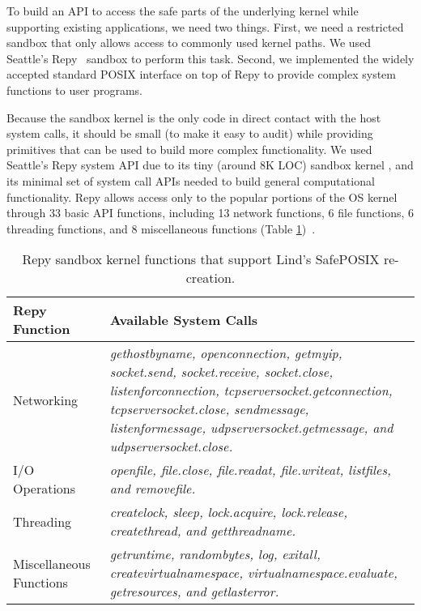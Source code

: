 To build an API to access the safe parts of the underlying kernel while
supporting existing applications, we need two things. First, we need a
restricted sandbox that only allows access to commonly used kernel paths. We
used Seattle's Repy~\cite{Repy-10} sandbox to perform this task. Second, we
implemented the widely accepted standard POSIX interface on top of Repy to
provide complex system functions to user programs.

Because the sandbox kernel is the only code in direct contact with the host
system calls, it should be small (to make it easy to audit) while providing
primitives that can be used to build more complex functionality.
We used Seattle's Repy system API due to its tiny (around 8K LOC) sandbox
kernel , and its minimal set of system call APIs needed to build general
computational functionality. Repy allows access only to the popular portions of
the OS kernel through 33 basic API functions, including 13 network functions, 6
file functions, 6 threading functions, and 8 miscellaneous functions (Table
\ref{table:RepyKernel})~\cite{Repy-10, RepyKernel}.

\begin{table}
\centering
\caption {Repy sandbox kernel functions that support Lind's SafePOSIX re-creation.}

  \begin{tabular}{ | p{2.5cm} | p{4.5cm} |}
  \hline
  \textbf{Repy Function} & \textbf{Available System Calls}  \\ \hline

Networking & \emph{gethostbyname, openconnection, getmyip, socket.send, socket.receive, socket.close,
listenforconnection, tcpserversocket.getconnection, tcpserversocket.close, sendmessage, listenformessage,
udpserversocket.getmessage, and udpserversocket.close.} \\ \hline

I/O Operations & \emph{openfile, file.close, file.readat, file.writeat, listfiles, and removefile.} \\ \hline

Threading & \emph{createlock, sleep, lock.acquire, lock.release, createthread, and getthreadname.} \\ \hline

Miscellaneous Functions & \emph{getruntime, randombytes, log, exitall, createvirtualnamespace,
virtualnamespace.evaluate, getresources, and getlasterror.}  \\ \hline
    \end{tabular}
    \label{table:RepyKernel}
\end{table}


